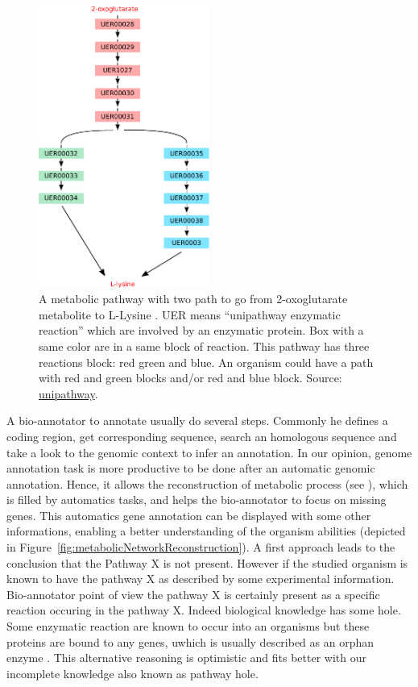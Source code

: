\documentclass{llncs}
\begin{document}
\begin{figure}[H]
    \centering
    \includegraphics[width=0.5\textwidth]{img/unipathway.pdf}
    \caption{A metabolic pathway with two path to go from 2-oxoglutarate metabolite to L-Lysine . UER means ``unipathway enzymatic reaction'' which are involved by an enzymatic protein. Box with a same color are in a same block of reaction. This pathway has three reactions block: red green and blue. An organism could have a path with red and green blocks and/or red and blue block. Source: \href{http://www.grenoble.prabi.fr}{unipathway}.}
    \label{fig:pathway}
\end{figure}

A bio-annotator to annotate usually do several steps. Commonly he defines a coding region, get corresponding sequence, search an homologous sequence and take a look to the genomic context to infer an annotation. In our opinion, genome annotation task is more productive to be done after an automatic genomic annotation. Hence, it allows the reconstruction of metabolic process (see \cite{francke2005reconstructing}), which is filled by automatics tasks, and helps the bio-annotator to focus on missing genes. This automatics gene annotation can be displayed with some other informations,
enabling a better understanding of the organism abilities (depicted in Figure~\ref{fig:metabolicNetworkReconstruction}). A first approach leads to the conclusion that the Pathway X is not present. However if the studied organism is known to have the pathway X as described by some experimental information. Bio-annotator point of view the pathway X is certainly present as a specific reaction occuring in the pathway X. Indeed biological knowledge has some hole. Some enzymatic reaction are known to occur into an  organisms but these proteins are bound to any genes, uwhich is usually described as an orphan enzyme \cite{sorokina2014profiling}. This alternative reasoning is optimistic and fits better with our incomplete knowledge also known as pathway hole.
\end{document}
